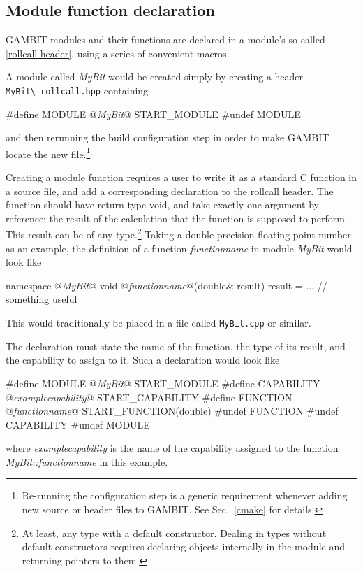 \documentclass[pdftex,twocolumn,epjc3_preprint,runningheads]{svjour3}
\renewcommand{\_}{\discretionary{\underscore}{}{\underscore}}
\newcommand\term[1]{{\lstset{style=terminal}\lstinline!#1!\lstset{style=cpp}}}
\newcommand{\cross}[1]{\ref{#1}}
\newcommand{\metavarf}[1]{\textit{\color{darkgreen}\footnotesize\textrm{#1}}}
\newcommand{\metavar}{\metavarf}
\newcommand{\gambit}{\textsf{GAMBIT}\xspace}
\newcommand{\GB}{\gambit}
\newcommand\xx{\raisebox{0.2ex}{\smaller ++}\xspace}
\newcommand\Cpp{\textsf{C\xx}\xspace}
\begin{document}
%
\subsection{Module function declaration}
\label{module_declaration}
%
\GB modules and their functions are declared in a module's so-called \cross{rollcall header}, using a series of convenient macros.

A module called \metavar{MyBit} would be created simply by creating a header \term{MyBit\_rollcall.hpp} containing
\begin{lstcpp}
#define MODULE @\metavar{MyBit}@
START_MODULE
#undef MODULE
\end{lstcpp}
and then rerunning the build configuration step in order to make \GB locate the new file.\footnote{Re-running the configuration step is a generic requirement whenever adding new source or header files to \GB.  See Sec.\ \ref{cmake} for details.}

Creating a module function requires a user to write it as a standard \Cpp function in a source file, and add a corresponding declaration to the rollcall header.  The function should have return type void, and take exactly one argument by reference: the result of the calculation that the function is supposed to perform.  This result can be of any type.\footnote{At least, any type with a default constructor.  Dealing in types without default constructors requires declaring objects internally in the module and returning pointers to them.}  Taking a double-precision floating point number as an example, the definition of a function \metavar{function\_name} in module \metavar{MyBit} would look like
\begin{lstcpp}
namespace @\metavar{MyBit}@
{
  void @\metavar{function\_name}@(double& result)
  {
    result = ... // something useful
  }
}
\end{lstcpp}
This would traditionally be placed in a file called \term{MyBit.cpp} or similar.

The declaration must state the name of the function, the type of its result, and the capability to assign to it.  Such a declaration would look like
\begin{lstcpp}
#define MODULE @\metavar{MyBit}@
START_MODULE
  #define CAPABILITY @\metavar{example\_capability}@
  START_CAPABILITY
    #define FUNCTION @\metavar{function\_name}@
    START_FUNCTION(double)
    #undef FUNCTION
  #undef CAPABILITY
#undef MODULE
\end{lstcpp}
where \metavar{example\_capability} is the name of the capability assigned to the function \metavar{MyBit::function\_name} in this example.
\end{document}

